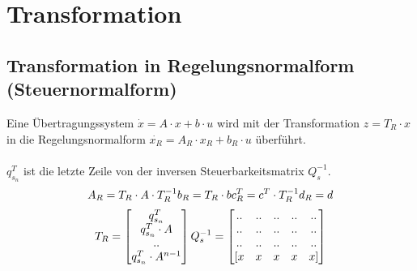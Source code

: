 



\section{Transformation}
\subsection{Transformation in Regelungsnormalform (Steuernormalform)}
Eine Übertragungssystem $\dot{x}=A\cdot x +  b \cdot u$ wird mit der Transformation $z=T_R\cdot x$ in die Regelungsnormalform  $\dot{x_R}=A_R\cdot x_R +  b_R \cdot u$ überführt.\\
\\
$q_{s_n}^T$ ist die letzte Zeile von der inversen Steuerbarkeitsmatrix $Q_s^{-1}$.
\[
	A_R = T_R\cdot A \cdot T_R^{-1}	\\	b_R = T_R\cdot b	\\	c_R^T = c^T\cdot T_R^{-1}	\\	d_R = d
\]
\[
	T_R=
	\begin{bmatrix}
		q_{s_n}^T \\
		q_{s_n}^T \cdot A \\
		.. \\
		q_{s_n}^T \cdot A^{n-1}\\	
	\end{bmatrix}	\\
	Q_s^{-1} =
	\begin{bmatrix}
			.. &	.. & .. & .. & ..\\
			.. &	.. & .. & .. & ..\\
			.. &	.. & .. & .. & ..\\
			 [x &	x & x & x & x]  \\	 
	\end{bmatrix}
\]

